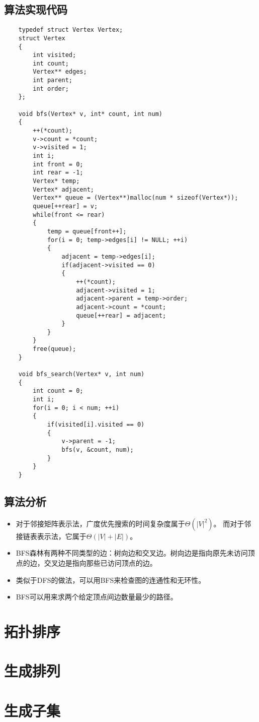 \documentclass[a4paper,left=2.5cm,right=2.5cm,11pt]{article}
\begin{document}
\subsection{算法实现代码}
	\begin{lstlisting}
	typedef struct Vertex Vertex;
	struct Vertex
	{
		int visited;
		int count;
		Vertex** edges;
		int parent;
		int order;
	};

	void bfs(Vertex* v, int* count, int num)
	{
		++(*count);
		v->count = *count;
		v->visited = 1;
		int i;
		int front = 0;
		int rear = -1;
		Vertex* temp;
		Vertex* adjacent;
		Vertex** queue = (Vertex**)malloc(num * sizeof(Vertex*));
		queue[++rear] = v;
		while(front <= rear)
		{
			temp = queue[front++];
			for(i = 0; temp->edges[i] != NULL; ++i)
			{
				adjacent = temp->edges[i];
				if(adjacent->visited == 0)
				{
					++(*count);
					adjacent->visited = 1;
					adjacent->parent = temp->order;
					adjacent->count = *count;
					queue[++rear] = adjacent;
				}
			}
		}
		free(queue);
	}

	void bfs_search(Vertex* v, int num)
	{
		int count = 0;
		int i;
		for(i = 0; i < num; ++i)
		{
			if(visited[i].visited == 0)
			{
				v->parent = -1;
				bfs(v, &count, num);
			}
		}
	}
	\end{lstlisting}

\subsection{算法分析}
	\begin{itemize}
		\item 对于邻接矩阵表示法，广度优先搜索的时间复杂度属于$\Theta(|V|^2)$。
		而对于邻接链表表示法，它属于$\Theta(|V|+|E|)$。
		\item BFS森林有两种不同类型的边：树向边和交叉边。树向边是指向原先未访问顶点的边，交叉边是指向那些已访问顶点的边。
		\item 类似于DFS的做法，可以用BFS来检查图的连通性和无环性。
		\item BFS可以用来求两个给定顶点间边数量最少的路径。 
	\end{itemize}

\section{拓扑排序}
\section{生成排列}
\section{生成子集}
\end{document}
